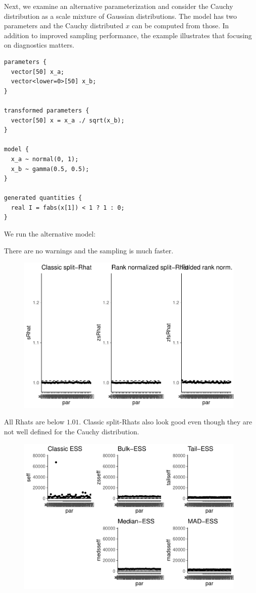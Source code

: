 \documentclass[american,]{article}
\begin{document}
Next, we examine an alternative parameterization and consider the Cauchy
distribution as a scale mixture of Gaussian distributions. The model has
two parameters and the Cauchy distributed \(x\) can be computed from
those. In addition to improved sampling performance, the example
illustrates that focusing on diagnostics matters.

\begin{verbatim}
parameters {
  vector[50] x_a;
  vector<lower=0>[50] x_b;
}

transformed parameters {
  vector[50] x = x_a ./ sqrt(x_b);
}

model {
  x_a ~ normal(0, 1);
  x_b ~ gamma(0.5, 0.5);
}

generated quantities {
  real I = fabs(x[1]) < 1 ? 1 : 0;
}
\end{verbatim}

We run the alternative model:

There are no warnings and the sampling is much faster.

\begin{figure}[t]
  \centering
  \includegraphics[width=0.6\linewidth]{graphics/rhat-fit-alt1-1.pdf}
\end{figure}

All Rhats are below \(1.01\). Classic split-Rhats also look good even
though they are not well defined for the Cauchy distribution.

\begin{figure}[t]
  \centering
  \includegraphics[width=0.6\linewidth]{graphics/ess-fit-alt1-1.pdf}
\end{figure}
\end{document}
